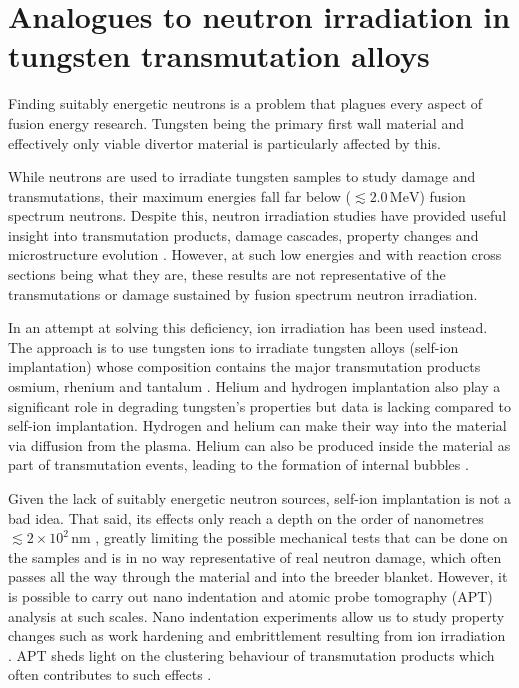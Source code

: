 \documentclass[12pt, a4paper]{article}
\begin{document}
	\section{Analogues to neutron irradiation in tungsten transmutation alloys}\label{s:ni}
		Finding suitably energetic neutrons is a problem that plagues every aspect of fusion energy research. Tungsten being the primary first wall material and effectively only viable divertor material \cite{wdivwall} is particularly affected by this. 
		
		While neutrons are used to irradiate tungsten samples to study damage and transmutations, their maximum energies fall far below ($\lesssim 2.0\,\textrm{MeV}$) fusion spectrum neutrons. Despite this, neutron irradiation studies have provided useful insight into transmutation products, damage cascades, property changes and microstructure evolution \cite{transmute, nirrhard, colcas, nirrprop, nirpropmic, nirrmic}. However, at such low energies and with reaction cross sections being what they are, these results are not representative of the transmutations or damage sustained by fusion spectrum neutron irradiation.
		
		In an attempt at solving this deficiency, ion irradiation has been used instead. The approach is to use tungsten ions to irradiate tungsten alloys (self-ion implantation) whose composition contains the major transmutation products osmium, rhenium and tantalum \cite{ionirrmic, ionirrprop, ionirrprop2, hardening}. Helium and hydrogen implantation also play a significant role in degrading tungsten's properties \cite{helium} but data is lacking compared to self-ion implantation. Hydrogen and helium can make their way into the material via diffusion from the plasma. Helium can also be produced inside the material as part of transmutation events, leading to the formation of internal bubbles \cite{transmute, transmute2}.
		
		Given the lack of suitably energetic neutron sources, self-ion implantation is not a bad idea. That said, its effects only reach a depth on the order of nanometres $\lesssim 2 \times 10^{2}\, \textrm{nm}$ \cite{ionirrprop, ionirrprop2, hardening}, greatly limiting the possible mechanical tests that can be done on the samples and is in no way representative of real neutron damage, which often passes all the way through the material and into the breeder blanket. However, it is possible to carry out nano indentation and atomic probe tomography (APT) analysis at such scales. Nano indentation experiments allow us to study property changes such as work hardening and embrittlement resulting from ion irradiation \cite{ionirrmic, ionirrprop, ionirrprop2, hardening}. APT sheds light on the clustering behaviour of transmutation products which often contributes to such effects \cite{ionirrprop, ionirrprop2, hardening}.
		
\end{document}
